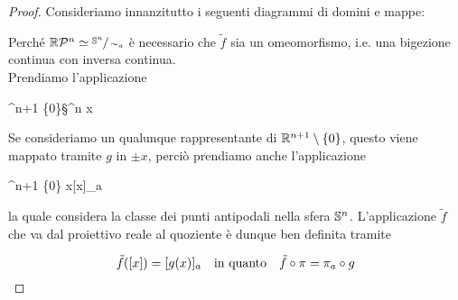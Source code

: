 \begin{proof}
	Consideriamo innanzitutto i seguenti diagrammi di domini e mappe:
	

	Perché $ \rp{n} \simeq \sfrac{\S^{n}}{\sim_{a}} $ è necessario che $ \tilde{f} $ sia un omeomorfismo, i.e. una bigezione continua con inversa continua. \\
	Prendiamo l'applicazione
	
		{\R^{n+1} \setminus \{0\}}{\S^{n}}
		{x}{}

	Se consideriamo un qualunque rappresentante di $ \R^{n+1} \setminus \{0\} $, questo viene mappato tramite $ g $ in $ \pm x $, perciò prendiamo anche l'applicazione
	
		{\R^{n+1} \setminus \{0\}}{}
		{x}{[x]_{a}}

	la quale considera la classe dei punti antipodali nella sfera $ \S^{n} $. L'applicazione $ \tilde{f} $ che va dal proiettivo reale al quoziente è dunque ben definita tramite
	
	\begin{equation}
		\tilde{f}([x]) = [g(x)]_{a} \qq{in quanto} \tilde{f} \circ \pi = \pi_{a} \circ g
	\end{equation}


\end{proof}
